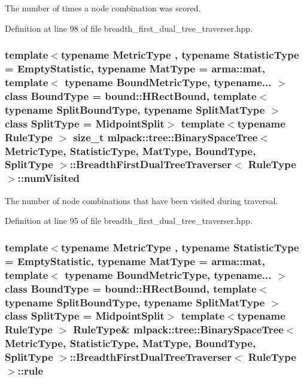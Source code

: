 The number of times a node combination was scored. 



Definition at line 98 of file breadth\+\_\+first\+\_\+dual\+\_\+tree\+\_\+traverser.\+hpp.

\subsubsection[{num\+Visited}]{\setlength{\rightskip}{0pt plus 5cm}template$<$typename Metric\+Type , typename Statistic\+Type  = Empty\+Statistic, typename Mat\+Type  = arma\+::mat, template$<$ typename Bound\+Metric\+Type, typename... $>$ class Bound\+Type = bound\+::\+H\+Rect\+Bound, template$<$ typename Split\+Bound\+Type, typename Split\+Mat\+Type $>$ class Split\+Type = Midpoint\+Split$>$ template$<$typename Rule\+Type $>$ size\+\_\+t {\bf mlpack\+::tree\+::\+Binary\+Space\+Tree}$<$ Metric\+Type, Statistic\+Type, Mat\+Type, Bound\+Type, Split\+Type $>$\+::{\bf Breadth\+First\+Dual\+Tree\+Traverser}$<$ Rule\+Type $>$\+::num\+Visited\hspace{0.3cm}{\ttfamily [private]}}\label{classmlpack_1_1tree_1_1BinarySpaceTree_1_1BreadthFirstDualTreeTraverser_ae3abb5b402baaa7b885305fa51c992e7}


The number of node combinations that have been visited during traversal. 



Definition at line 95 of file breadth\+\_\+first\+\_\+dual\+\_\+tree\+\_\+traverser.\+hpp.

\subsubsection[{rule}]{\setlength{\rightskip}{0pt plus 5cm}template$<$typename Metric\+Type , typename Statistic\+Type  = Empty\+Statistic, typename Mat\+Type  = arma\+::mat, template$<$ typename Bound\+Metric\+Type, typename... $>$ class Bound\+Type = bound\+::\+H\+Rect\+Bound, template$<$ typename Split\+Bound\+Type, typename Split\+Mat\+Type $>$ class Split\+Type = Midpoint\+Split$>$ template$<$typename Rule\+Type $>$ Rule\+Type\& {\bf mlpack\+::tree\+::\+Binary\+Space\+Tree}$<$ Metric\+Type, Statistic\+Type, Mat\+Type, Bound\+Type, Split\+Type $>$\+::{\bf Breadth\+First\+Dual\+Tree\+Traverser}$<$ Rule\+Type $>$\+::rule\hspace{0.3cm}{\ttfamily [private]}}\label{classmlpack_1_1tree_1_1BinarySpaceTree_1_1BreadthFirstDualTreeTraverser_ad9322d8ecd9244b9943f1e54be69ca7e}


